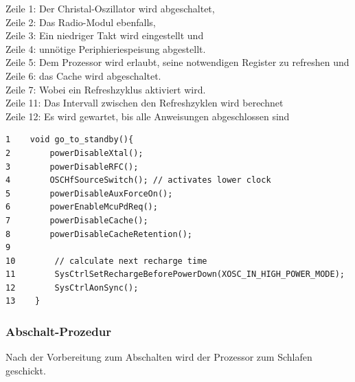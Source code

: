 Zeile 1:\hspace{1cm}    Der Christal-Oszillator wird abgeschaltet,\\
Zeile 2:\hspace{1cm}   Das Radio-Modul ebenfalls,\\ 
Zeile 3:\hspace{1cm}   Ein niedriger Takt wird eingestellt und\\ 
Zeile 4:\hspace{1cm}   unnötige Periphieriespeisung abgestellt.\\ 
Zeile 5:\hspace{1cm}   Dem Prozessor wird erlaubt, seine notwendigen Register zu refreshen und\\ 
Zeile 6:\hspace{1cm}   das Cache wird abgeschaltet.\\ 
Zeile 7:\hspace{1cm}   Wobei ein Refreshzyklus aktiviert wird.\\
Zeile 11:\hspace{1cm}  Das Intervall zwischen den Refreshzyklen wird berechnet\\
Zeile 12:\hspace{1cm}  Es wird gewartet, bis alle Anweisungen abgeschlossen sind\\



\begin{minipage}[t]{1\textwidth}
\small\begin{verbatim}
1    void go_to_standby(){ 
2        powerDisableXtal();
3        powerDisableRFC();
4        OSCHfSourceSwitch(); // activates lower clock
5        powerDisableAuxForceOn();
6        powerEnableMcuPdReq();
7        powerDisableCache();
8        powerDisableCacheRetention();
9
10        // calculate next recharge time
11        SysCtrlSetRechargeBeforePowerDown(XOSC_IN_HIGH_POWER_MODE);
12        SysCtrlAonSync();
13    } 
    \end{verbatim}\normalsize
\end{minipage} 	    

\subsubsection{Abschalt-Prozedur}
\label{ausschalten}

Nach der Vorbereitung zum Abschalten wird der Prozessor zum Schlafen geschickt.\\

